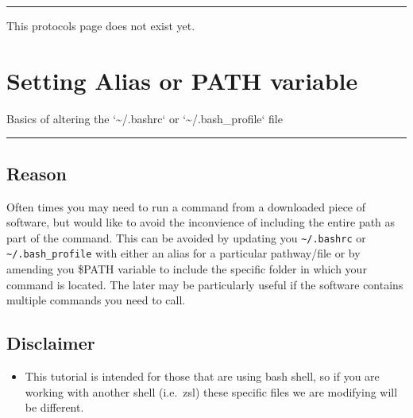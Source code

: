 \documentclass[
  letterpaper,
  DIV=11,
  numbers=noendperiod]{scrreprt}
\providecommand{\tightlist}{%
  \setlength{\itemsep}{0pt}\setlength{\parskip}{0pt}}\usepackage{longtable,booktabs,array}
\begin{document}
\begin{center}\rule{0.5\linewidth}{0.5pt}\end{center}

This protocols page does not exist yet.

\hypertarget{setting-alias-or-path-variable}{%
\chapter{Setting Alias or PATH
variable}\label{setting-alias-or-path-variable}}

Basics of altering the `\textasciitilde/.bashrc` or
`\textasciitilde/.bash\_profile` file

\begin{center}\rule{0.5\linewidth}{0.5pt}\end{center}

\hypertarget{reason}{%
\section*{\texorpdfstring{\textbf{Reason}}{Reason}}\label{reason}}


Often times you may need to run a command from a downloaded piece of
software, but would like to avoid the inconvience of including the
entire path as part of the command. This can be avoided by updating you
\texttt{\textasciitilde{}/.bashrc} or
\texttt{\textasciitilde{}/.bash\_profile} with either an alias for a
particular pathway/file or by amending you \$PATH variable to include
the specific folder in which your command is located. The later may be
particularly useful if the software contains multiple commands you need
to call.

\hypertarget{disclaimer}{%
\section*{\texorpdfstring{\textbf{Disclaimer}}{Disclaimer}}\label{disclaimer}}


\begin{itemize}
\tightlist
\item
  This tutorial is intended for those that are using bash shell, so if
  you are working with another shell (i.e.~zsl) these specific files we
  are modifying will be different.
\end{itemize}
\end{document}
